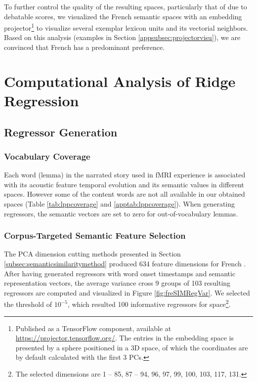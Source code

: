 


To further control the quality of the resulting spaces, particularly that of  due to debatable scores, we visualized the French semantic spaces with an embedding projector\footnote{Published as a TensorFlow component, available at \url{https://projector.tensorflow.org/}. The entries in the embedding space is presented by a sphere positioned in a 3D space, of which the coordinates are by default calculated with the first 3 PCs.} to visualize several exemplar lexicon units and its vectorial neighbors. Based on this analysis (examples in Section \ref{appsubsec:projectorvisu}), we are convinced that French  has a predominant \association preference.


\section{Computational Analysis of Ridge Regression}

\subsection{Regressor Generation}

\subsubsection{Vocabulary Coverage}
Each word (lemma) in the narrated story used in fMRI experience is associated with its  acoustic feature temporal evolution and its semantic values in different spaces. However some of the content words are not all available in our obtained spaces (Table \ref{tab:lppcoverage} and \ref{apptab:lppcoverage}). When generating regressors, the semantic vectors are set to zero for out-of-vocabulary lemmas. 



\subsubsection{Corpus-Targeted Semantic Feature Selection}

The PCA dimension cutting methods presented in Section \ref{subsec:semanticsimilaritymethod} produced 634 feature dimensions for French . After having generated regressors with word onset timestamps and semantic representation vectors, the average variance cross 9 groups of 103 resulting regressors are computed and visualized in Figure \ref{fig:freSIMRegVar}. We selected the threshold of \(10^{-5}\), which resulted 100 informative regressors for  space\footnote{The selected dimensions are 1 -- 85, 87 -- 94, 96, 97, 99, 100, 103, 117, 131.}.

